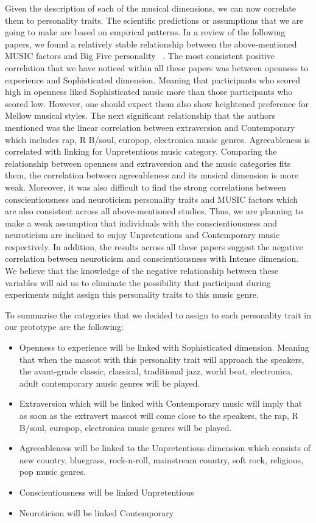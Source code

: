 Given the description of each of the musical dimensions, we can now correlate them to personality traits.
The scientific predictions or assumptions that we are going to make are based on empirical patterns.
In a review of the following papers, we found a relatively stable relationship between the
above-mentioned MUSIC factors and Big Five
personality ~\cite{schafer2017can,bonneville2013music,fricke2017personality,greenberg2016song,langmeyer2012music}.
The most consistent positive correlation that we have noticed within all these papers was
between openness to experience and Sophisticated dimension.
Meaning that participants who scored high in openness liked
Sophisticated music more than those participants who scored low.
However, one should expect them also show heightened preference for Mellow musical styles.
The next significant relationship that the authors mentioned was the linear correlation between
extraversion and Contemporary which includes rap, R B/soul, europop, electronica music genres.
Agreeableness is correlated with linking for Unpretentious music category.
Comparing the relationship between openness and extraversion and the music categories fits them,
the correlation between agreeableness and its musical dimension is more weak.
Moreover, it was also difficult to find the strong correlations between
conscientiousness and neuroticism personality traits and MUSIC factors which are
also consistent across all above-mentioned studies.
Thus, we are planning to make a weak assumption that individuals with the
conscientiousness and neuroticism are inclined to enjoy Unpretentious and Contemporary music respectively.
In addition, the results across all these papers suggest the negative correlation between
neuroticism and conscientiousness with Intense dimension.
We believe that the knowledge of the negative relationship between these variables will aid us to eliminate
the possibility that participant during experiments might assign this personality traits to this music genre.

To summarise the categories that we decided to assign to each personality trait in our prototype are the following:
\begin{itemize}
\item Openness to experience will be linked with Sophisticated dimension.
      Meaning that when the mascot with this personality trait will approach the speakers,
      the avant-grade classic, classical, traditional jazz, world beat, electronica, adult
      contemporary music genres will be played.
\item Extraversion which will be linked with Contemporary music will imply that as soon as the extravert
      mascot will come close to the speakers, the rap, R B/soul, europop, electronica music genres will be played.
\item Agreeableness will be linked to the Unpretentious dimension which consists of new country,
      bluegrass, rock-n-roll, mainstream country, soft rock, religious, pop music genres.
\item Conscientiousness will be linked Unpretentious
\item Neuroticism will be linked Contemporary
\end{itemize}

